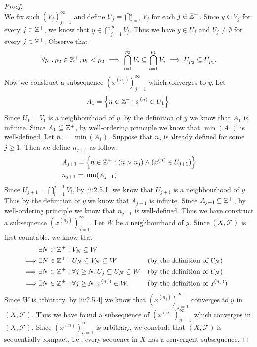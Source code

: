 \begin{proof}
\[  \]
  We fix such \((V_j)_{j = 1}^\infty\) and define \(U_j = \bigcap_{i = 1}^j V_j\) for each \(j \in \mathbb{Z}^+\).
  Since \(y \in V_j\) for every \(j \in \mathbb{Z}^+\), we know that \(y \in \bigcap_{j = 1}^\infty V_j\).
  Thus we have \(y \in U_j\) and \(U_j \neq \emptyset\) for every \(j \in \mathbb{Z}^+\).
  Observe that
  \[
    \forall p_1, p_2 \in \mathbb{Z}^+, p_1 < p_2 \implies \bigcap_{i = 1}^{p_2} V_i \subseteq \bigcap_{i = 1}^{p_1} V_i \implies U_{p_2} \subseteq U_{p_1}.
  \]
  Now we construct a subsequence \((x^{(n_j)})_{j = 1}^\infty\) which converges to \(y\).
  Let
  \[
    A_1 = \set{n \in \Z^+ : x^{(n)} \in U_1}.
  \]
  Since \(U_1 = V_1\) is a neighbourhood of \(y\), by the definition of \(y\) we know that \(A_1\) is infinite.
  Since \(A_1 \subseteq \mathbb{Z}^+\), by well-ordering principle we know that \(\min(A_1)\) is well-defined.
  Let \(n_1 = \min(A_1)\).
  Suppose that \(n_j\) is already defined for some \(j \geq 1\).
  Then we define \(n_{j + 1}\) as follow:
  \begin{align*}
     & A_{j + 1} = \left\lbrace n \in \mathbb{Z}^+ : (n > n_j) \land (x^{(n)} \in U_{j + 1})\right\rbrace \\
     & n_{j + 1} = \min(A_{j + 1})
  \end{align*}
  Since \(U_{j + 1} = \bigcap_{i = 1}^{j + 1} V_i\), by \cref{ii:2.5.1} we know that \(U_{j + 1}\) is a neighbourhood of \(y\).
  Thus by the definition of \(y\) we know that \(A_{j + 1}\) is infinite.
  Since \(A_{j + 1} \subseteq \mathbb{Z}^+\), by well-ordering principle we know that \(n_{j + 1}\) is well-defined.
  Thus we have construct a subsequence \((x^{(n_j)})_{j = 1}^\infty\).
  Let \(W\) be a neighbourhood of \(y\).
  Since \((X, \mathcal{F})\) is first countable, we know that
  \begin{align*}
             & \exists N \in \mathbb{Z}^+ : V_N \subseteq W                                                                                  \\
    \implies & \exists N \in \mathbb{Z}^+ : U_N \subseteq V_N \subseteq W                   &  & \text{(by the definition of \(U_N\))}       \\
    \implies & \exists N \in \mathbb{Z}^+ : \forall j \geq N, U_j \subseteq U_N \subseteq W &  & \text{(by the definition of \(U_N\))}       \\
    \implies & \exists N \in \mathbb{Z}^+ : \forall j \geq N, x^{(n_j)} \in W.              &  & \text{(by the definition of \(x^{(n_j)}\))}
  \end{align*}
  Since \(W\) is arbitrary, by \cref{ii:2.5.4} we know that \((x^{(n_j)})_{j = 1}^\infty\) converges to \(y\) in \((X, \mathcal{F})\).
  Thus we have found a subsequence of \((x^{(n)})_{n = 1}^\infty\) which converges in \((X, \mathcal{F})\).
  Since \((x^{(n)})_{n = 1}^\infty\) is arbitrary, we conclude that \((X, \mathcal{F})\) is sequentially compact, i.e., every sequence in \(X\) has a convergent subsequence.
\end{proof}

